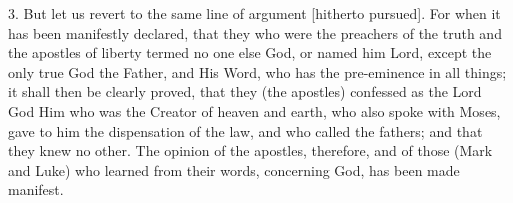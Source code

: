 3. But let us revert to the same line of argument [hitherto pursued]. For when it has been manifestly declared, that they who were the preachers of the truth and the apostles of liberty termed no one else God, or named him Lord, except the only true God the Father, and His Word, who has the pre-eminence in all things; it shall then be clearly proved, that they (the apostles) confessed as the Lord God Him who was the Creator of heaven and earth, who also spoke with Moses, gave to him the dispensation of the law, and who called the fathers; and that they knew no other. The opinion of the apostles, therefore, and of those (Mark and Luke) who learned from their words, concerning God, has been made manifest.


